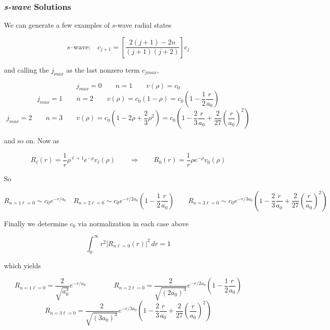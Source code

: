 \vspace{5px}




\subsubsection{\textit{s-wave} Solutions}

We can generate a few examples of $s$-wave radial states 

\[
  s \text{--wave:} \quad c_{j+1} = \left[ \frac{2(j+1)
  - 2n}{(j+1)(j+2)}\right] c_j
\] \vspace{3px}

and calling the $j_{max}$ as the last nonzero term $c_{jmax}$, 

\[ j_{max} = 0 \qquad n = 1 \qquad v(\rho) = c_0 \] 
\[ j_{max} = 1 \qquad n= 2 \qquad v(\rho) = c_0(1 - \rho) = c_0 \left(1
- \frac{1}{2}\frac{r}{a_0}\right) \] 
\[ j_{max} = 2 \qquad n = 3 \qquad v(\rho) = c_0 \left( 1 - 2\rho + \frac{2}{3}
    \rho^2\right) = c_0 \left( 1 - \frac{2}{3} \frac{r}{a_0} + \frac{2}{27}
  \left( \frac{r}{a_0} \right)^2  \right)  \] \vspace{3px}

and so on. Now as 

\[
  R_\ell (r) = \frac{1}{r} \rho^{\ell +1} e^{-\rho} v_\ell (\rho) \qquad
  \Rightarrow \qquad R_0(r) = \frac{1}{r} \rho e^{-\rho} v_0(\rho)
\] \vspace{3px}

So 

\[
  R_{n=1\ell =0} \sim c_0 e^{-r / a_0} \quad R_{n=2\ell =0} \sim c_0e^{-r/2a_0}
  \left( 1 - \frac{1}{2} \frac{r}{a_0} \right) \qquad R_{n=3\ell =0} \sim c_0
  e^{-r / 3a_0 } \left( 1-\frac{2}{3}\frac{r}{a_0} + \frac{2}{27}\left(
  \frac{r}{a_0} \right) ^2  \right)  
\] \vspace{3px}

Finally we determine $c_0$ via normalization in each case above 

\[
  \int_{0}^{\infty} r^2 |R_{n\ell =0}(r)|^2 \, dr = 1
\] \vspace{3px}

which yields 

\[ R_{n=1\ell =0} = \frac{2}{\sqrt{a_0^3}}e^{-r / a_0}  \qquad \qquad R_{n=2
  \ell =0} = \frac{2}{\sqrt{(2a_0)^3}}e^{-r / 2a_0} \left( 1 - \frac{1}{2}
\frac{r}{a_0} \right) \] 
\[ R_{n=3 \ell = 0} = \frac{2}{\sqrt{(3a_0)^3}}e^{-r / 3a_0} \left(
  1 - \frac{2}{3} \frac{r}{a_0} + \frac{2}{27} \left( \frac{r}{a_0} \right)^2
\right)  \] \vspace{3px}


